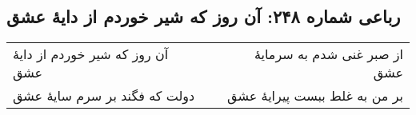 \begin{center}
\section*{رباعی شماره ۲۴۸: آن روز که شیر خوردم از دایهٔ عشق}
\label{sec:sh248}
\begin{longtable}{l p{0.5cm} r}
آن روز که شیر خوردم از دایهٔ عشق
&&
از صبر غنی شدم به سرمایهٔ عشق
\\
دولت که فگند بر سرم سایهٔ عشق
&&
بر من به غلط ببست پیرایهٔ عشق
\\
\end{longtable}
\end{center}
